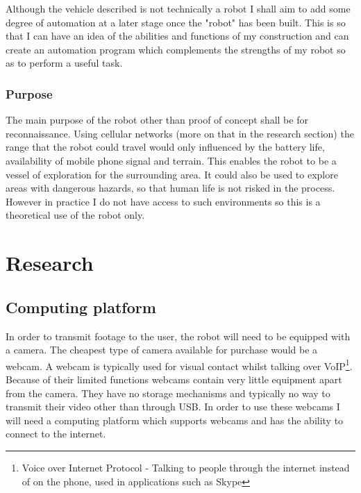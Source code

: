 \documentclass[]{report}   %
\begin{document}
				Although the vehicle described is not technically a robot I shall aim to add some degree of automation at
				a later stage once the "robot" has been built. This is so that I can have an idea of the abilities and
				functions of my construction and can create an automation program which complements the strengths of my 
				robot so as to perform a useful task.

					
				\subsection{Purpose}
					The main purpose of the robot other than proof of concept shall be for reconnaissance. Using cellular
					networks (more on that in the research section) the range that the robot could travel would only influenced by
					the battery life, availability of mobile phone signal and terrain. This enables the robot to be a vessel of
					exploration for the surrounding area. It could also be used to explore areas with dangerous hazards, so that
					human life is not risked in the process. However in practice I do not have access to such environments so this
					is a theoretical use of the robot only.
		
		\chapter{Research}
			\section{Computing platform}
				In order to transmit footage to the user, the robot will need to be equipped with a camera. The cheapest type of camera
				available for purchase would be a webcam. A webcam is typically used for visual contact whilst talking over
				VoIP\footnote{Voice over Internet Protocol - Talking to people through the internet instead of on the phone, used in
					applications such as Skype}.
				Because of their limited functions webcams contain very little equipment apart from the camera. They have no storage mechanisms
				and typically no way to transmit their video other than through USB. In order to use these webcams I will need a computing
				platform which supports webcams and has the ability to connect to the internet.
				
\end{document}

